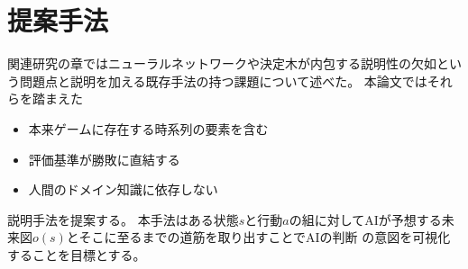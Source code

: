 \chapter{提案手法}
関連研究の章ではニューラルネットワークや決定木が内包する説明性の欠如という問題点と説明を加える既存手法の持つ課題について述べた。
本論文ではそれらを踏まえた
\begin{itemize}
	\item 本来ゲームに存在する時系列の要素を含む
	\item 評価基準が勝敗に直結する
    \item 人間のドメイン知識に依存しない
\end{itemize}
説明手法を提案する。
本手法はある状態$s$と行動$a$の組に対してAIが予想する未来図$o(s)$とそこに至るまでの道筋を取り出すことでAIの判断
の意図を可視化することを目標とする。


